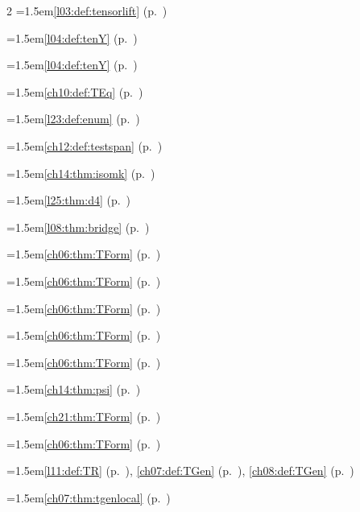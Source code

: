 \begin{multicols}{2}
\hangindent=1.5em\quad \ref{l03:def:tensorlift} (p.~\pageref{l03:def:tensorlift})\par
\hangindent=1.5em\quad \ref{l04:def:tenY} (p.~\pageref{l04:def:tenY})\par
\hangindent=1.5em\quad \ref{l04:def:tenY} (p.~\pageref{l04:def:tenY})\par
\hangindent=1.5em\quad \ref{ch10:def:TEq} (p.~\pageref{ch10:def:TEq})\par
\hangindent=1.5em\quad \ref{l23:def:enum} (p.~\pageref{l23:def:enum})\par
\hangindent=1.5em\quad \ref{ch12:def:testspan} (p.~\pageref{ch12:def:testspan})\par
\hangindent=1.5em\quad \ref{ch14:thm:isomk} (p.~\pageref{ch14:thm:isomk})\par
\hangindent=1.5em\quad \ref{l25:thm:d4} (p.~\pageref{l25:thm:d4})\par
\hangindent=1.5em\quad \ref{l08:thm:bridge} (p.~\pageref{l08:thm:bridge})\par
\hangindent=1.5em\quad \ref{ch06:thm:TForm} (p.~\pageref{ch06:thm:TForm})\par
\hangindent=1.5em\quad \ref{ch06:thm:TForm} (p.~\pageref{ch06:thm:TForm})\par
\hangindent=1.5em\quad \ref{ch06:thm:TForm} (p.~\pageref{ch06:thm:TForm})\par
\hangindent=1.5em\quad \ref{ch06:thm:TForm} (p.~\pageref{ch06:thm:TForm})\par
\hangindent=1.5em\quad \ref{ch06:thm:TForm} (p.~\pageref{ch06:thm:TForm})\par
\hangindent=1.5em\quad \ref{ch14:thm:psi} (p.~\pageref{ch14:thm:psi})\par
\hangindent=1.5em\quad \ref{ch21:thm:TForm} (p.~\pageref{ch21:thm:TForm})\par
\hangindent=1.5em\quad \ref{ch06:thm:TForm} (p.~\pageref{ch06:thm:TForm})\par
\hangindent=1.5em\quad \ref{l11:def:TR} (p.~\pageref{l11:def:TR}), \ref{ch07:def:TGen} (p.~\pageref{ch07:def:TGen}), \ref{ch08:def:TGen} (p.~\pageref{ch08:def:TGen})\par
\hangindent=1.5em\quad \ref{ch07:thm:tgenlocal} (p.~\pageref{ch07:thm:tgenlocal})\par

\end{multicols}

